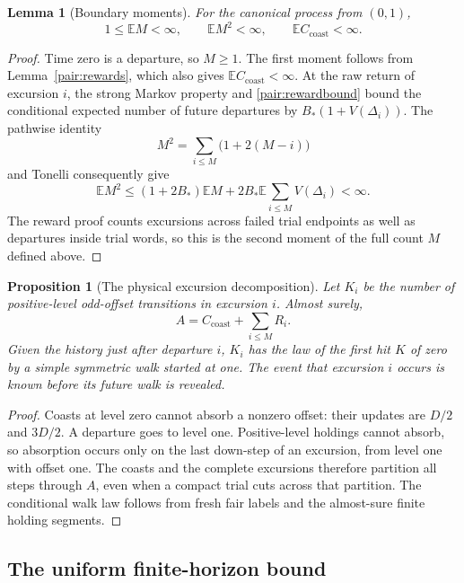 \documentclass[11pt]{amsart}
\newtheorem{proposition}[theorem]{Proposition}
\newtheorem{lemma}[theorem]{Lemma}
\theoremstyle{definition}
\theoremstyle{remark}
\newcommand{\E}{\mathbb E}
\begin{document}
\begin{lemma}[Boundary moments]\label{pair:moments}\label{pair:coasts}
For the canonical process from $(0,1)$,
\[
 1\le\E M<\infty,\qquad \E M^2<\infty,\qquad \E C_{\mathrm{coast}}<\infty.
\]
\end{lemma}
\begin{proof}
Time zero is a departure, so $M\ge1$.  The first moment follows from
Lemma~\ref{pair:rewards}, which also gives $\E C_{\mathrm{coast}}<\infty$. At the raw return of excursion $i$, the strong
Markov property and \eqref{pair:rewardbound} bound the conditional expected
number of future departures by $B_*(1+V(\Delta_i))$.  The pathwise identity
\[
 M^2=\sum_{i\le M}\bigl(1+2(M-i)\bigr)
\]
and Tonelli consequently give
\[
 \E M^2\le(1+2B_*)\E M+
 2B_*\E\sum_{i\le M}V(\Delta_i)<\infty.
\]
The reward proof counts excursions across failed trial endpoints as well
as departures inside trial words, so this is the second moment of the
full count $M$ defined above.
\end{proof}

\begin{proposition}[The physical excursion decomposition]\label{pair:decomposition}
Let $K_i$ be the number of positive-level odd-offset transitions in
excursion $i$. Almost surely,
\begin{equation}\label{pair:timesplit}
 A=C_{\mathrm{coast}}+\sum_{i\le M}R_i.
\end{equation}
Given the history just after departure $i$, $K_i$ has the law of the first
hit $K$ of zero by a simple symmetric walk started at one.  The event
that excursion $i$ occurs is known before its future walk is revealed.
\end{proposition}
\begin{proof}
Coasts at level zero cannot absorb a nonzero offset: their updates are
$D/2$ and $3D/2$.  A departure goes to level one.  Positive-level holdings
cannot absorb, so absorption occurs only on the last down-step of an
excursion, from level one with offset one.  The coasts and the complete
excursions therefore partition all steps through $A$, even when a compact
trial cuts across that partition.  The conditional walk law follows
from fresh fair labels and the almost-sure finite holding segments.
\end{proof}

\subsection{The uniform finite-horizon bound}
\end{document}
